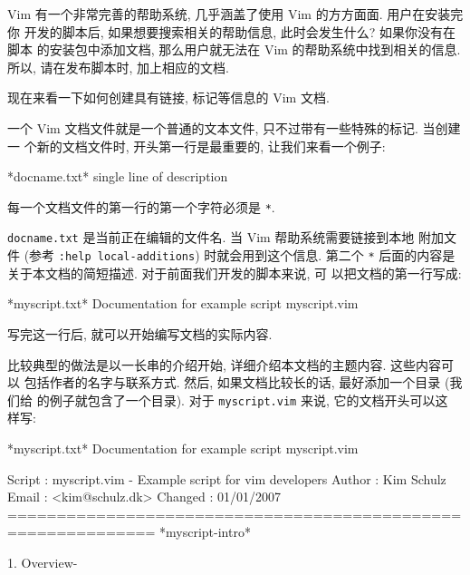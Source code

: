 Vim 有一个非常完善的帮助系统, 几乎涵盖了使用 Vim 的方方面面. 用户在安装完你
开发的脚本后, 如果想要搜索相关的帮助信息, 此时会发生什么? 如果你没有在脚本
的安装包中添加文档, 那么用户就无法在 Vim 的帮助系统中找到相关的信息. 所以,
请在发布脚本时, 加上相应的文档.

现在来看一下如何创建具有链接, 标记等信息的 Vim 文档.

一个 Vim 文档文件就是一个普通的文本文件, 只不过带有一些特殊的标记. 当创建一
个新的文档文件时, 开头第一行是最重要的, 让我们来看一个例子:
\begin{vimcode}
*docname.txt* single line of description
\end{vimcode}
每一个文档文件的第一行的第一个字符必须是 \texttt{*}.

\texttt{docname.txt} 是当前正在编辑的文件名. 当 Vim 帮助系统需要链接到本地
附加文件 (参考 \texttt{:help local-additions}) 时就会用到这个信息. 第二个
\texttt{*} 后面的内容是关于本文档的简短描述. 对于前面我们开发的脚本来说, 可
以把文档的第一行写成:
\begin{vimcode}
*myscript.txt* Documentation for example script myscript.vim
\end{vimcode}
写完这一行后, 就可以开始编写文档的实际内容.

比较典型的做法是以一长串的介绍开始, 详细介绍本文档的主题内容. 这些内容可以
包括作者的名字与联系方式. 然后, 如果文档比较长的话, 最好添加一个目录 (我们给
的例子就包含了一个目录). 对于 \texttt{myscript.vim} 来说, 它的文档开头可以这
样写:
\begin{vimcode}
*myscript.txt* Documentation for example script myscript.vim

Script  : myscript.vim - Example script for vim developers
Author  : Kim Schulz
Email   : <kim@schulz.dk>
Changed : 01/01/2007
=============================================================
                                            *myscript-intro*

1. Overview-
\end{vimcode}
